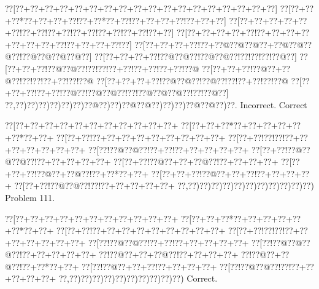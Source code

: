 \documentclass[a5paper]{article}
\begin{document}
\begin{center}
{\goo
\0??[\0??+\0??+\0??+\0??+\0??+\0??+\0??+\0??+\0??+\0??+\0??+\0??+\0??+\0??+\0??+\0??+\0??+\0??]
\0??[\0??+\0??+\0??*\0??+\0??+\0??+\0??!\0??+\0??*\0??+\0??!\0??+\0??+\0??+\0??!\0??+\0??+\0??]
\0??[\0??+\0??+\0??+\0??+\0??+\0??!\0??+\0??!\0??+\0??!\0??+\0??!\0??+\0??!\0??+\0??!\0??+\0??]
\0??[\0??+\0??+\0??+\0??+\0??!\0??+\0??+\0??+\0??+\0??+\0??+\0??+\0??!\0??+\0??+\0??+\0??!\0??]
\0??[\0??+\0??+\0??+\0??!\0??+\0??@\0??@\0??@\0??+\0??@\0??@\0??@\0??!\0??@\0??@\0??@\0??@\0??]
\0??[\0??+\0??+\0??+\0??!\0??@\0??@\0??!\0??@\0??@\0??!\0??!\0??!\0??!\0??@\0??]
\0??[\0??+\0??+\0??!\0??@\0??@\0??!\0??!\0??!\0??+\0??!\0??+\0??!\0??+\0??!\0??@
\0??[\0??+\0??+\0??!\0??@\0??+\0??@\0??!\0??!\0??!\0??+\0??!\0??!\0??@
\0??[\0??+\0??+\0??+\0??!\0??@\0??@\0??!\0??@\0??!\0??!\0??+\0??!\0??!\0??@
\0??[\0??+\0??+\0??!\0??+\0??!\0??@\0??!\0??@\0??@\0??!\0??!\0??@\0??@\0??@\0??!\0??!\0??@\0??]
\0??,\0??)\0??)\0??)\0??)\0??)\0??)\0??@\0??)\0??)\0??@\0??@\0??)\0??)\0??)\0??@\0??@\0??)\0??.
}
Incorrect. Correct

\end{center}
\newpage
\begin{center}
{\goo
\0??[\0??+\0??+\0??+\0??+\0??+\0??+\0??+\0??+\0??+\0??+\0??+
\0??[\0??+\0??+\0??*\0??+\0??+\0??+\0??+\0??+\0??*\0??+\0??+
\0??[\0??+\0??!\0??+\0??+\0??+\0??+\0??+\0??+\0??+\0??+\0??+
\0??[\0??+\0??!\0??!\0??!\0??+\0??+\0??+\0??+\0??+\0??+\0??+
\0??[\0??!\0??@\0??@\0??!\0??+\0??!\0??+\0??+\0??+\0??+\0??+
\0??[\0??+\0??!\0??@\0??@\0??@\0??!\0??+\0??+\0??+\0??+\0??+
\0??[\0??+\0??!\0??@\0??+\0??+\0??@\0??!\0??+\0??+\0??+\0??+
\0??[\0??+\0??+\0??!\0??@\0??+\0??@\0??!\0??+\0??*\0??+\0??+
\0??[\0??+\0??+\0??!\0??@\0??+\0??+\0??!\0??+\0??+\0??+\0??+
\0??[\0??+\0??!\0??@\0??@\0??!\0??!\0??+\0??+\0??+\0??+\0??+
\0??,\0??)\0??)\0??)\0??)\0??)\0??)\0??)\0??)\0??)\0??)\0??)
}
Problem 111.

\end{center}
\begin{center}
{\goo
\0??[\0??+\0??+\0??+\0??+\0??+\0??+\0??+\0??+\0??+\0??+\0??+
\0??[\0??+\0??+\0??*\0??+\0??+\0??+\0??+\0??+\0??*\0??+\0??+
\0??[\0??+\0??!\0??+\0??+\0??+\0??+\0??+\0??+\0??+\0??+\0??+
\0??[\0??+\0??!\0??!\0??!\0??+\0??+\0??+\0??+\0??+\0??+\0??+
\0??[\0??!\0??@\0??@\0??!\0??+\0??!\0??+\0??+\0??+\0??+\0??+
\0??[\0??!\0??@\0??@\0??@\0??!\0??+\0??+\0??+\0??+\0??+
\0??!\0??@\0??+\0??+\0??@\0??!\0??+\0??+\0??+\0??+
\0??!\0??@\0??+\0??@\0??!\0??+\0??*\0??+\0??+
\0??[\0??!\0??@\0??+\0??+\0??!\0??+\0??+\0??+\0??+
\0??[\0??!\0??@\0??@\0??!\0??!\0??+\0??+\0??+\0??+\0??+
\0??,\0??)\0??)\0??)\0??)\0??)\0??)\0??)\0??)\0??)\0??)
}
Correct. 

\end{center}
\end{document}
